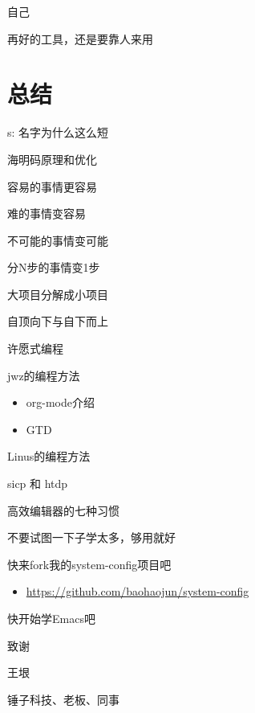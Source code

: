\documentclass[presentation,dvipdfmx,CJKbookmarks]{beamer}
\begin{document}
\begin{CJK*}{UTF8}{simsun}
\begin{frame}[label={sec:orgeddfc5f}]{自己}
\begin{block}{再好的工具，还是要靠人来用}
\end{block}
\end{frame}
\section{总结}
\label{sec:org747c2c6}
\begin{frame}[label={sec:org7672c40}]{s: 名字为什么这么短}
\begin{block}{海明码原理和优化}
\end{block}
\begin{block}{容易的事情更容易}
\end{block}
\begin{block}{难的事情变容易}
\end{block}
\begin{block}{不可能的事情变可能}
\end{block}
\begin{block}{分N步的事情变1步}
\end{block}
\begin{block}{大项目分解成小项目}
\end{block}
\begin{block}{自顶向下与自下而上}
\end{block}
\end{frame}
\begin{frame}[label={sec:org5332b22}]{许愿式编程}
\begin{block}{jwz的编程方法}
\begin{itemize}
\item org-mode介绍
\item GTD
\end{itemize}
\end{block}
\begin{block}{Linus的编程方法}
\end{block}
\begin{block}{sicp 和 htdp}
\end{block}
\end{frame}
\begin{frame}[label={sec:org4dded1d}]{高效编辑器的七种习惯}
\begin{block}{不要试图一下子学太多，够用就好}
\end{block}
\begin{block}{快来fork我的system-config项目吧}
\begin{itemize}
\item \url{https://github.com/baohaojun/system-config}
\end{itemize}
\end{block}
\begin{block}{快开始学Emacs吧}
\end{block}
\end{frame}

\begin{frame}[label={sec:org9c40df9}]{致谢}
\begin{block}{王垠}
\end{block}
\begin{block}{锤子科技、老板、同事}
\end{block}
\end{frame}
\end{CJK*}
\end{document}
